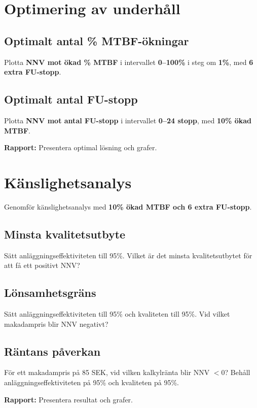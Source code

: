 \documentclass[a4paper,12pt]{exam}
\begin{document}
\section{Optimering av underhåll}
\subsection{Optimalt antal \% MTBF-ökningar}
Plotta \textbf{NNV mot ökad \% MTBF} i intervallet \textbf{0–100\%} i steg om \textbf{1\%}, med \textbf{6 extra FU-stopp}.

\subsection{Optimalt antal FU-stopp}
Plotta \textbf{NNV mot antal FU-stopp} i intervallet \textbf{0–24 stopp}, med \textbf{10\% ökad MTBF}.

\textbf{Rapport:} Presentera optimal lösning och grafer.

\section{Känslighetsanalys}
Genomför känslighetsanalys med \textbf{10\% ökad MTBF och 6 extra FU-stopp}.

\subsection{Minsta kvalitetsutbyte}
Sätt anläggningseffektiviteten till 95\%. Vilket är det minsta kvalitetsutbytet för att få ett positivt NNV?

\subsection{Lönsamhetsgräns}
Sätt anläggningseffektiviteten till 95\% och kvaliteten till 95\%. Vid vilket makadampris blir NNV negativt?

\subsection{Räntans påverkan}
För ett makadampris på 85 SEK, vid vilken kalkylränta blir NNV $<0$? Behåll anläggningseffektiviteten på 95\% och kvaliteten på 95\%.

\textbf{Rapport:} Presentera resultat och grafer.
\end{document}
